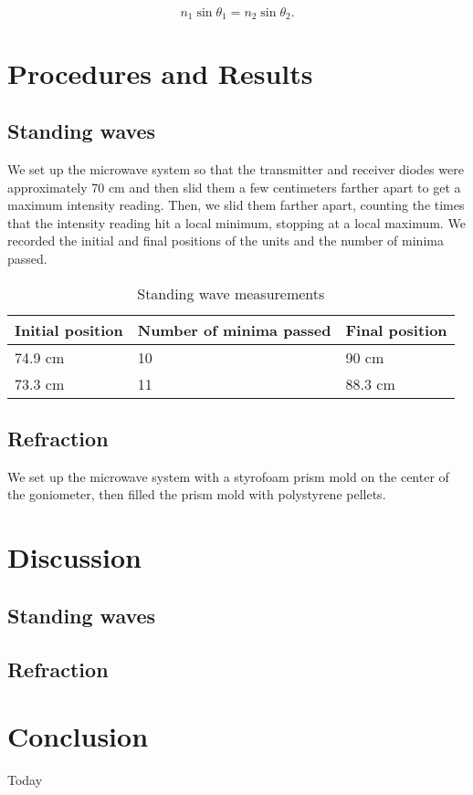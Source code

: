 \documentclass[11pt, titlepage, letterpaper, twoside]{article}
\begin{document}
\begin{equation}
  n_1 \sin \theta_1 = n_2 \sin \theta_2.
\end{equation}

\section{Procedures and Results}

\subsection{Standing waves}

We set up the microwave system so that the transmitter and receiver diodes were approximately 70 cm and then slid them
a few centimeters farther apart to get a maximum intensity reading. Then, we slid them farther apart, counting the
times that the intensity reading hit a local minimum, stopping at a local maximum. We recorded the initial and final
positions of the units and the number of minima passed.

\begin{table}[h!]
\centering
\caption{Standing wave measurements}
\label{stwav}
\begin{tabular}{|l|l|l|}
\hline
Initial position & Number of minima passed & Final position \\ \hline
74.9 cm          & 10                      & 90 cm          \\ \hline
73.3 cm          & 11                      & 88.3 cm        \\ \hline
\end{tabular}
\end{table}

\subsection{Refraction}

We set up the microwave system with a styrofoam prism mold on the center of the goniometer, then filled the prism mold
with polystyrene pellets.

\section{Discussion}

\subsection{Standing waves}


\subsection{Refraction}




\section{Conclusion}
Today
\end{document}
